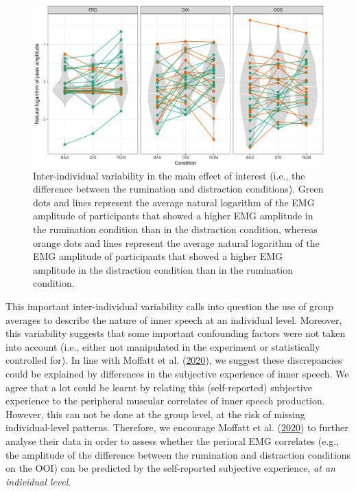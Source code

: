 \documentclass[
  english,
  man, donotrepeattitle,floatsintext]{apa6}
\begin{document}
\begin{figure}[!htb]

{\centering \includegraphics[width=1\linewidth]{manuscript_files/figure-latex/everyone-1} 

}

\caption{Inter-individual variability in the main effect of interest (i.e., the difference between the rumination and distraction conditions). Green dots and lines represent the average natural logarithm of the EMG amplitude of participants that showed a higher EMG amplitude in the rumination condition than in the distraction condition, whereas orange dots and lines represent the average natural logarithm of the EMG amplitude of participants that showed a higher EMG amplitude in the distraction condition than in the rumination condition.}\label{fig:everyone}
\end{figure}

This important inter-individual variability calls into question the use of group averages to describe the nature of inner speech at an individual level. Moreover, this variability suggests that some important confounding factors were not taken into account (i.e., either not manipulated in the experiment or statistically controlled for). In line with Moffatt et al. (\protect\hyperlink{ref-moffatt_inner_2020}{2020}), we suggest these discrepancies could be explained by differences in the subjective experience of inner speech. We agree that a lot could be learnt by relating this (self-reported) subjective experience to the peripheral muscular correlates of inner speech production. However, this can not be done at the group level, at the risk of missing individual-level patterns. Therefore, we encourage Moffatt et al. (\protect\hyperlink{ref-moffatt_inner_2020}{2020}) to further analyse their data in order to assess whether the perioral EMG correlates (e.g., the amplitude of the difference between the rumination and distraction conditions on the OOI) can be predicted by the self-reported subjective experience, \emph{at an individual level}.
\end{document}
